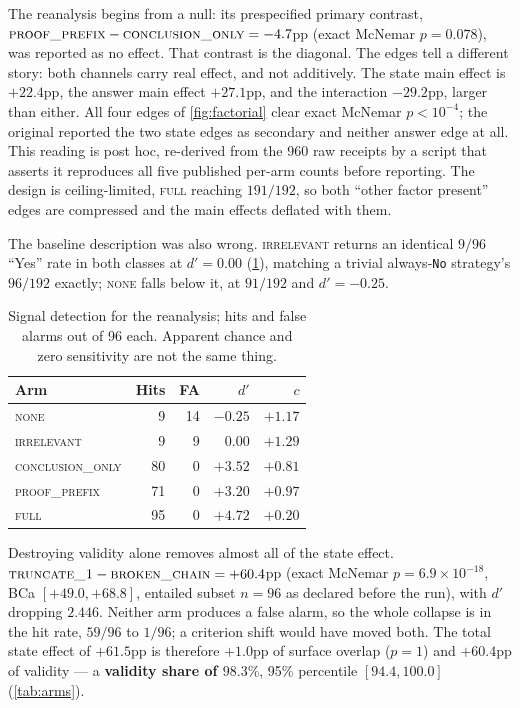 \documentclass{article}
\begin{document}
The reanalysis begins from a null: its prespecified primary contrast,
$\textsc{proof\_prefix} - \textsc{conclusion\_only} = -4.7$pp (exact McNemar
$p = 0.078$), was reported as no effect. That contrast is the diagonal. The
edges tell a different story: both channels carry real effect, and not
additively. The state
main effect is $+22.4$pp, the answer main effect $+27.1$pp, and the interaction
$-29.2$pp, larger than either. All four edges of \cref{fig:factorial} clear
exact McNemar $p < 10^{-4}$; the original reported the two state edges as
secondary and neither answer edge at all. This reading is post hoc, re-derived
from the 960 raw receipts by a script that asserts it reproduces all five
published per-arm counts before reporting. The
design is ceiling-limited, \textsc{full} reaching $191/192$, so both
``other factor present'' edges are compressed and the main effects deflated
with them.

The baseline description was also wrong. \textsc{irrelevant} returns an
identical $9/96$ ``Yes'' rate in both classes at $d' = 0.00$ (\cref{tab:sdt}),
matching a trivial always-\texttt{No} strategy's $96/192$ exactly; \textsc{none}
falls below it, at $91/192$ and $d' = -0.25$.

\begin{table}[tb]
\centering\small
\caption{Signal detection for the reanalysis; hits and false alarms out of 96
each. Apparent chance and zero
sensitivity are not the same thing.}
\label{tab:sdt}
\begin{tabular}{lrrrr}
\toprule
Arm & Hits & FA & $d'$ & $c$ \\
\midrule
\textsc{none} & 9 & 14 & $-0.25$ & $+1.17$ \\
\textsc{irrelevant}      &  9 &  9 & $\mathbf{0.00}$ & $+1.29$ \\
\textsc{conclusion\_only}& 80 &  0 & $+3.52$ & $+0.81$ \\
\textsc{proof\_prefix}   & 71 &  0 & $+3.20$ & $+0.97$ \\
\textsc{full}            & 95 &  0 & $+4.72$ & $+0.20$ \\
\bottomrule
\end{tabular}
\end{table}

Destroying validity alone removes almost all of the state effect.
$\textsc{truncate\_1} - \textsc{broken\_chain} = +60.4$pp (exact McNemar
$p = 6.9\times10^{-18}$, BCa $[+49.0, +68.8]$, entailed subset $n = 96$ as
declared before the run), with $d'$ dropping $2.446$. Neither arm produces a
false alarm, so the whole collapse is in the hit rate, $59/96$ to $1/96$; a
criterion shift would have moved both. The total state effect of $+61.5$pp is therefore $+1.0$pp of
surface overlap ($p = 1$) and $+60.4$pp of validity --- a \textbf{validity share
of $98.3\%$}, 95\% percentile $[94.4, 100.0]$ (\cref{tab:arms}).
\end{document}
